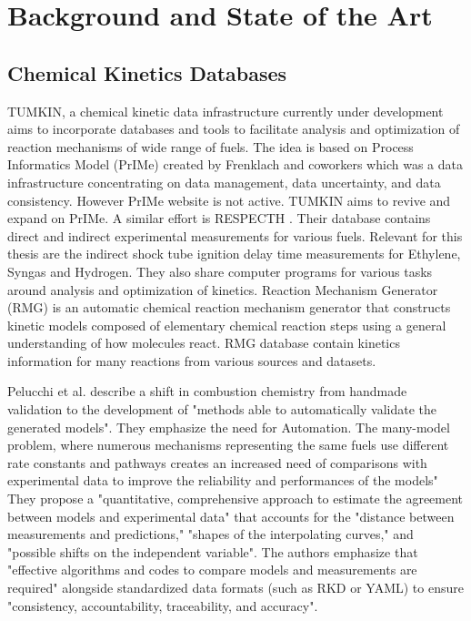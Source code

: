 \chapter{Background and State of the Art}\label{Chap:Theory}

\section{Chemical Kinetics Databases}
TUMKIN, a chemical kinetic data infrastructure currently under development aims to incorporate databases and tools to facilitate analysis and optimization of reaction mechanisms of wide range of fuels. The idea is based on Process Informatics Model (PrIMe) created by Frenklach and coworkers which  was a data infrastructure concentrating on data management, data uncertainty, and data consistency. \cite{frenklach_transforming_2007} However PrIMe website is not active. TUMKIN aims to revive and expand on PrIMe. A similar effort is RESPECTH \cite{turanyi_respecth_2025}. Their database contains direct and indirect experimental measurements for various fuels. Relevant for this thesis are the indirect shock tube ignition delay time measurements for Ethylene, Syngas and Hydrogen. \cite{su_comparison_2024}\cite{varga_development_2016}\cite{varga_optimization_2015} They also share computer programs for various tasks around analysis and optimization of kinetics. Reaction Mechanism Generator (RMG) is an automatic chemical reaction mechanism generator that constructs kinetic models composed of elementary chemical reaction steps using a general understanding of how molecules react. RMG database contain kinetics information for many reactions from various sources and datasets. \cite{johnson_rmg_2022}


Pelucchi et al. \cite{pelucchi_addressing_2019} describe a shift in combustion chemistry from handmade validation to the development of "methods able to automatically validate the generated models". They emphasize the need for Automation. The many-model problem, where numerous mechanisms representing the same fuels use different rate constants and pathways creates an increased need of comparisons with experimental data to improve the reliability and performances of the models"
They propose a "quantitative, comprehensive approach to estimate the agreement between models and experimental data" that accounts for the "distance between measurements and predictions," "shapes of the interpolating curves," and "possible shifts on the independent variable".
The authors emphasize that "effective algorithms and codes to compare models and measurements are required" alongside standardized data formats (such as RKD or YAML) to ensure "consistency, accountability, traceability, and accuracy".


